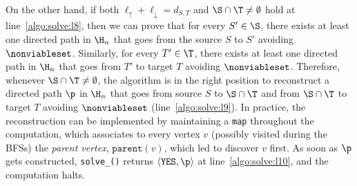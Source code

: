 On the other
hand,
if both $\ell_\uparrow+\ell_\downarrow = d_{S,T}$ and
$\S\cap\T\neq\emptyset$ hold at line~\ref{algo:solve:l8},
then we can prove that for
every $S'\in\S$, there exists at least one directed path in $\H_n$
that goes from the source $S$ to $S'$ avoiding $\nonviableset$.
Similarly, for every $T'\in\T$, there exists at least one directed
path in $\H_n$ that goes from $T'$ to target $T$ avoiding $\nonviableset$.
Therefore, whenever $\S\cap\T\neq\emptyset$, the algorithm is in the right position to reconstruct
a directed path $\p$ in $\H_n$ that goes
from source $S$ to $\S\cap\T$ and from $\S\cap\T$ to target $T$ avoiding $\nonviableset$ (line~\ref{algo:solve:l9}).
In practice, the reconstruction can be implemented by maintaining a \texttt{map}
throughout the computation, which associates to every vertex $v$ (possibly visited during the BFSs)
the \emph{parent vertex}, $\texttt{parent}(v)$, which
led to discover $v$ first.
As soon as $\p$ gets constructed,
\texttt{solve\_\mainproblem()} returns $\langle\texttt{YES}, \p\rangle$
at line~\ref{algo:solve:l10},
and the computation halts.

